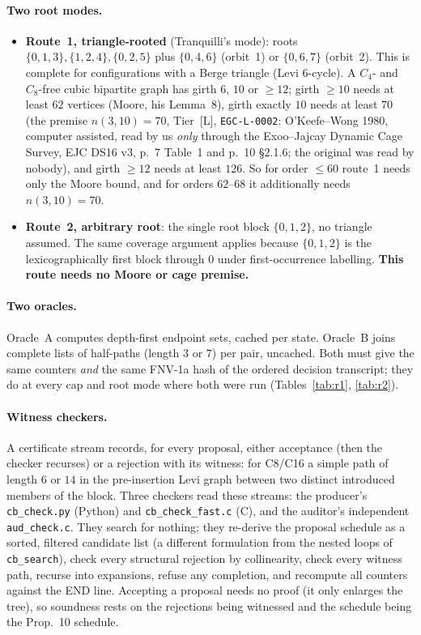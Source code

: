 \documentclass[10pt]{article}
\newcommand{\tier}[1]{\textsf{[#1]}}
\newcommand{\tL}{\tier{L}}
\begin{document}
\paragraph{Two root modes.}
\begin{itemize}\itemsep=1pt
\item \textbf{Route~1, triangle-rooted} (Tranquilli's mode): roots $\{0,1,3\},\{1,2,4\},\{0,2,5\}$ plus $\{0,4,6\}$ (orbit~1) or $\{0,6,7\}$ (orbit~2). This is complete for configurations with a Berge triangle (Levi $6$-cycle). A $C_4$- and $C_8$-free cubic bipartite graph has girth $6$, $10$ or $\ge12$; girth $\ge10$ needs at least $62$ vertices (Moore, his Lemma~8), girth exactly $10$ needs at least $70$ (the premise $n(3,10)=70$, Tier~\tL{}, \texttt{EGC-L-0002}: O'Keefe--Wong 1980, computer assisted, read by us \emph{only} through the Exoo--Jajcay Dynamic Cage Survey, EJC DS16 v3, p.~7 Table~1 and p.~10 \S2.1.6; the original was read by nobody), and girth $\ge12$ needs at least $126$. So for order $\le60$ route~1 needs only the Moore bound, and for orders $62$--$68$ it additionally needs $n(3,10)=70$.
\item \textbf{Route~2, arbitrary root}: the single root block $\{0,1,2\}$, no triangle assumed. The same coverage argument applies because $\{0,1,2\}$ is the lexicographically first block through $0$ under first-occurrence labelling. \textbf{This route needs no Moore or cage premise.}
\end{itemize}
\paragraph{Two oracles.} Oracle~A computes depth-first endpoint sets, cached per state. Oracle~B joins complete lists of half-paths (length $3$ or $7$) per pair, uncached. Both must give the same counters \emph{and} the same FNV-1a hash of the ordered decision transcript; they do at every cap and root mode where both were run (Tables~\ref{tab:r1}, \ref{tab:r2}).
\paragraph{Witness checkers.} A certificate stream records, for every proposal, either acceptance (then the checker recurses) or a rejection with its witness: for C8/C16 a simple path of length $6$ or $14$ in the pre-insertion Levi graph between two distinct introduced members of the block. Three checkers read these streams: the producer's \texttt{cb\_check.py} (Python) and \texttt{cb\_check\_fast.c} (C), and the auditor's independent \texttt{aud\_check.c}. They search for nothing; they re-derive the proposal schedule as a sorted, filtered candidate list (a different formulation from the nested loops of \texttt{cb\_search}), check every structural rejection by collinearity, check every witness path, recurse into expansions, refuse any completion, and recompute all counters against the END line. Accepting a proposal needs no proof (it only enlarges the tree), so soundness rests on the rejections being witnessed and the schedule being the Prop.~10 schedule.
\end{document}
